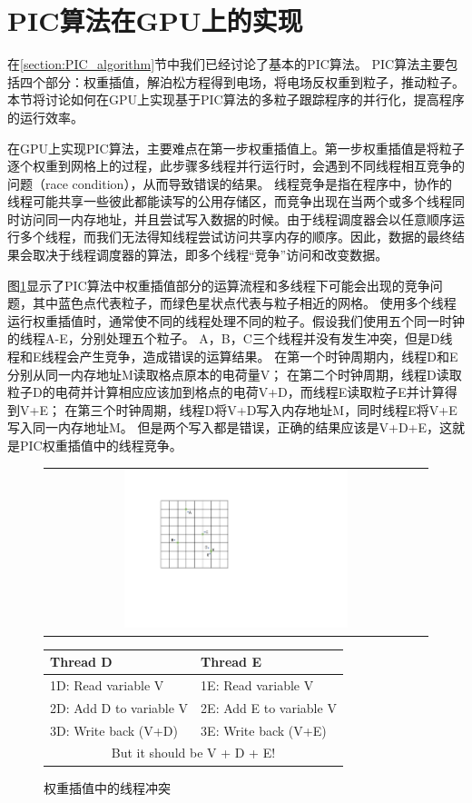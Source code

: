 \section{PIC算法在GPU上的实现}
在\ref{section:PIC_algorithm}节中我们已经讨论了基本的PIC算法。
PIC算法主要包括四个部分：权重插值，解泊松方程得到电场，将电场反权重到粒子，推动粒子。
本节将讨论如何在GPU上实现基于PIC算法的多粒子跟踪程序的并行化，提高程序的运行效率。

在GPU上实现PIC算法，主要难点在第一步权重插值上。第一步权重插值是将粒子逐个权重到网格上的过程，此步骤多线程并行运行时，会遇到不同线程相互竞争的问题（race condition），从而导致错误的结果。
线程竞争是指在程序中，协作的线程可能共享一些彼此都能读写的公用存储区，而竞争出现在当两个或多个线程同时访问同一内存地址，并且尝试写入数据的时候。由于线程调度器会以任意顺序运行多个线程，而我们无法得知线程尝试访问共享内存的顺序。因此，数据的最终结果会取决于线程调度器的算法，即多个线程“竞争”访问和改变数据。

图\ref{fig:PIC_weighting_threading}显示了PIC算法中权重插值部分的运算流程和多线程下可能会出现的竞争问题，其中蓝色点代表粒子，而绿色星状点代表与粒子相近的网格。
使用多个线程运行权重插值时，通常使不同的线程处理不同的粒子。假设我们使用五个同一时钟的线程A-E，分别处理五个粒子。
A，B，C三个线程并没有发生冲突，但是D线程和E线程会产生竞争，造成错误的运算结果。
在第一个时钟周期内，线程D和E分别从同一内存地址M读取格点原本的电荷量V；
在第二个时钟周期，线程D读取粒子D的电荷并计算相应应该加到格点的电荷V+D，而线程E读取粒子E并计算得到V+E；
在第三个时钟周期，线程D将V+D写入内存地址M，同时线程E将V+E写入同一内存地址M。
但是两个写入都是错误，正确的结果应该是V+D+E，这就是PIC权重插值中的线程竞争。

\begin{figure}[!htb]
  \centering
  \begin{tabular}{|l|l|}
    \multicolumn{2}{c}{
    \includegraphics[width=0.6\textwidth]{Img/3PIC_weighting.pdf}} \\
  \end{tabular}
  \begin{tabular}{|l|l|}
    \hline
    Thread D & Thread E  \\
    \hline
    1D: Read variable V     & 1E: Read variable V     \\
    2D: Add D to variable V & 2E: Add E to variable V \\
    3D: Write back (V+D)    & 3E: Write back (V+E)    \\
    \hline
    \multicolumn{2}{c}{But it should be V + D + E!}
  \end{tabular}
  \caption{权重插值中的线程冲突}
  \label{fig:PIC_weighting_threading}
\end{figure}

